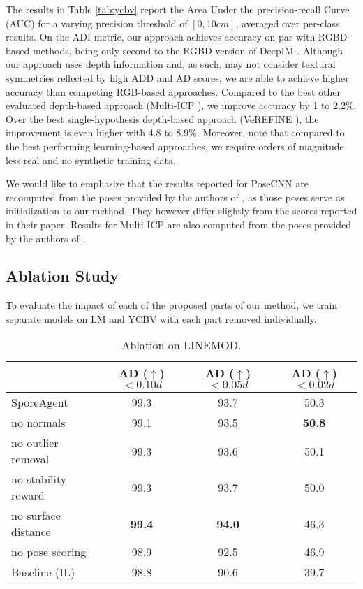 \documentclass[10pt,twocolumn,letterpaper]{article}
\begin{document}
The results in Table \ref{tab:ycbv} report the Area Under the precision-recall Curve (AUC) for a varying precision threshold of $[0,10cm]$, averaged over per-class results. On the ADI metric, our approach achieves accuracy on par with RGBD-based methods, being only second to the RGBD version of DeepIM \cite{li2018deepim}. Although our approach uses depth information and, as such, may not consider textural symmetries reflected by high ADD and AD scores, we are able to achieve higher accuracy than competing RGB-based approaches. Compared to the best other evaluated depth-based approach (Multi-ICP \cite{xiang2017posecnn}), we improve accuracy by 1 to 2.2\%. Over the best single-hypothesis depth-based approach (VeREFINE \cite{bauer2020verefine}), the improvement is even higher with 4.8 to 8.9\%. Moreover, note that compared to the best performing learning-based approaches, we require orders of magnitude less real and no synthetic training data.

We would like to emphasize that the results reported for PoseCNN are recomputed from the poses provided by the authors of \cite{xiang2017posecnn}, as those poses serve as initialization to our method. They however differ slightly from the scores reported in their paper. Results for Multi-ICP are also computed from the poses provided by the authors of \cite{xiang2017posecnn,li2018deepim}.


\subsection{Ablation Study}\label{sec:ablation}
To evaluate the impact of each of the proposed parts of our method, we train separate models on LM and YCBV with each part removed individually.

\begin{table}[]
\setlength\tabcolsep{1.0ex}
\footnotesize
    \centering
    \begin{tabular}{l|ccc}
                    & \makecell{AD ($\uparrow$)\\$<0.10d$} & \makecell{AD ($\uparrow$)\\$<0.05d$} & \makecell{AD ($\uparrow$)\\$<0.02d$}\\\hline
\rowcolor[rgb]{0.95,0.95,0.95}
SporeAgent           & 99.3 & 93.7 & 50.3 \\
no normals           & 99.1 & 93.5 & \textbf{50.8} \\
no outlier removal      & 99.3 & 93.6 & 50.1 \\
no stability reward  & 99.3 & 93.7 & 50.0 \\
no surface distance  & \textbf{99.4} & \textbf{94.0} & 46.3 \\
no pose scoring      & 98.9 & 92.5 & 46.9 \\ \hline
\rowcolor[rgb]{0.95,0.95,0.95}
Baseline (IL)       & 98.8 & 90.6 & 39.7 \\
    \end{tabular}\vspace{1ex}
    \caption{Ablation on LINEMOD.}
    \label{tab:ablation_lm}
\end{table}
\end{document}
